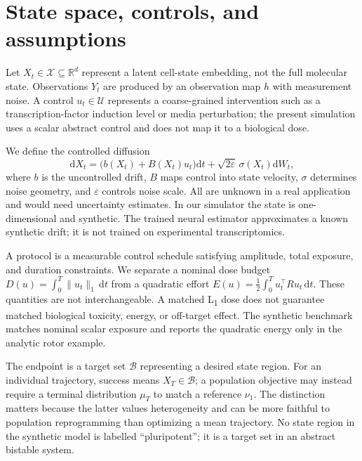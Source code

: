 \documentclass[11pt]{article}
\newcommand{\R}{\mathbb{R}}
\newcommand{\D}{\mathrm{d}}
\newcommand{\1}{\mathbf{1}}
\begin{document}
\section{State space, controls, and assumptions}
Let $X_t\in\mathcal{X}\subseteq\R^d$ represent a latent cell-state embedding, not the full molecular state. Observations $Y_t$ are produced by an observation map $h$ with measurement noise. A control $u_t\in\mathcal{U}$ represents a coarse-grained intervention such as a transcription-factor induction level or media perturbation; the present simulation uses a scalar abstract control and does not map it to a biological dose.

We define the controlled diffusion
\begin{equation}
\D X_t = \bigl(b(X_t)+B(X_t)u_t\bigr)\D t + \sqrt{2\varepsilon}\,\sigma(X_t)\D W_t,
\label{eq:sde}
\end{equation}
where $b$ is the uncontrolled drift, $B$ maps control into state velocity, $\sigma$ determines noise geometry, and $\varepsilon$ controls noise scale. All are unknown in a real application and would need uncertainty estimates. In our simulator the state is one-dimensional and synthetic. The trained neural estimator approximates a known synthetic drift; it is not trained on experimental transcriptomics.

A protocol is a measurable control schedule satisfying amplitude, total exposure, and duration constraints. We separate a nominal dose budget $D(u)=\int_0^T\|u_t\|_1\,\D t$ from a quadratic effort $E(u)=\tfrac12\int_0^T u_t^\top R u_t\,\D t$. These quantities are not interchangeable. A matched L\textsubscript{1} dose does not guarantee matched biological toxicity, energy, or off-target effect. The synthetic benchmark matches nominal scalar exposure and reports the quadratic energy only in the analytic rotor example.

The endpoint is a target set $\mathcal{B}$ representing a desired state region. For an individual trajectory, success means $X_T\in\mathcal{B}$; a population objective may instead require a terminal distribution $\mu_T$ to match a reference $\nu_1$. The distinction matters because the latter values heterogeneity and can be more faithful to population reprogramming than optimizing a mean trajectory. No state region in the synthetic model is labelled “pluripotent”; it is a target set in an abstract bistable system.
\end{document}
